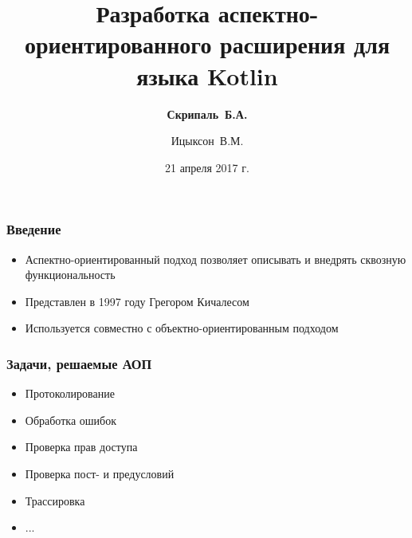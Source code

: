\documentclass[hyperref={pdftex,unicode}]{beamer}
\begin{document}
	
	
\title[АОП-расширение для Kotlin]
{Разработка аспектно-ориентированного расширения для языка Kotlin}
\author[Скрипаль Б.]{{\bf Скрипаль~Б.А.} \and Ицыксон~В.М.}
\date[21.04.2017]{21 апреля 2017 г.}

\maketitle
\begin{frame}[fragile=singleslide]
	\frametitle{Введение}
	\begin{itemize}
		\item Аспектно-ориентированный подход позволяет описывать и
		      внедрять сквозную функциональность
		\item Представлен в 1997 году Грегором Кичалесом
		\item Используется совместно с объектно-ориентированным подходом
	\end{itemize}
\end{frame}

\begin{frame}[fragile=singleslide]
	\frametitle{Задачи, решаемые АОП}
	\begin{itemize}
		\item Протоколирование
		\item Обработка ошибок
		\item Проверка прав доступа
		\item Проверка пост- и предусловий
		\item Трассировка
		\item ...
	\end{itemize}
\end{frame}
\end{document}
